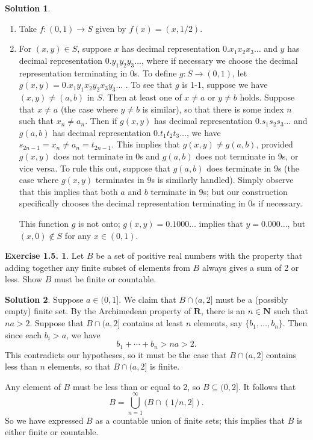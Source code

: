 \documentclass[12pt]{article}
\theoremstyle{definition}
\theoremstyle{exercise}
\newtheorem{exercise}{Exercise 1.5.}
\theoremstyle{solution}
\newtheorem*{solution}{Solution}
\newcommand{\N}{\mathbf{N}}
\newcommand{\R}{\mathbf{R}}
\begin{document}
\begin{solution}
    \begin{enumerate}
        \item Take \( f : (0, 1) \to S \) given by \( f(x) = (x, 1/2) \).

        \item For \( (x, y) \in S \), suppose \( x \) has decimal representation \( 0.x_1 x_2 x_3 \ldots \) and \( y \) has decimal representation \( 0.y_1 y_2 y_3 \ldots  \), where if necessary we choose the decimal representation terminating in 0s. To define \( g : S \to (0, 1) \), let \( g(x, y) = 0.x_1 y_1 x_2 y_2 x_3 y_3 \ldots \) . To see that \( g \) is 1-1, suppose we have \( (x, y) \neq (a, b) \) in \( S \). Then at least one of \( x \neq a \) or \( y \neq b \) holds. Suppose that \( x \neq a \) (the case where \( y \neq b \) is similar), so that there is some index \( n \) such that \( x_n \neq a_n \). Then if \( g(x, y) \) has decimal representation \( 0.s_1 s_2 s_3 \ldots \) and \( g(a, b) \) has decimal representation \( 0.t_1 t_2 t_3 \ldots \), we have \( s_{2n - 1} = x_n \neq a_n = t_{2n - 1} \). This implies that \( g(x, y) \neq g(a, b) \), provided \( g(x, y) \) does not terminate in 0s and \( g(a, b) \) does not terminate in 9s, or vice versa. To rule this out, suppose that \( g(a, b) \) does terminate in 9s (the case where \( g(x, y) \) terminates in 9s is similarly handled). Simply observe that this implies that both \( a \) and \( b \) terminate in 9s; but our construction specifically chooses the decimal representation terminating in 0s if necessary.

        This function \( g \) is not onto; \( g(x, y) = 0.1000\ldots \) implies that \( y = 0.000 \ldots \), but \( (x, 0) \not\in S \) for any \( x \in (0, 1) \).
    \end{enumerate}
\end{solution}

\begin{exercise}
\label{ex:8}
    Let \( B \) be a set of positive real numbers with the property that adding together any finite subset of elements from \( B \) always gives a sum of 2 or less. Show \( B \) must be finite or countable.
\end{exercise}

\begin{solution}
    Suppose \( a \in (0, 1] \). We claim that \( B \cap (a, 2] \) must be a (possibly empty) finite set. By the Archimedean property of \( \R \), there is an \( n \in \N \) such that \( na > 2 \). Suppose that \( B \cap (a, 2] \) contains at least \( n \) elements, say \( \{ b_1, \ldots, b_n \} \). Then since each \( b_i > a \), we have
    \[
        b_1 + \cdots + b_n > na > 2.
    \]
    This contradicts our hypotheses, so it must be the case that \( B \cap (a, 2] \) contains less than \( n \) elements, so that \( B \cap (a, 2] \) is finite.

    Any element of \( B \) must be less than or equal to 2, so \( B \subseteq (0, 2] \). It follows that
    \[
        B = \bigcup_{n=1}^{\infty} (B \cap (1/n, 2]).
    \]
    So we have expressed \( B \) as a countable union of finite sets; this implies that \( B \) is either finite or countable.
\end{solution}
\end{document}
